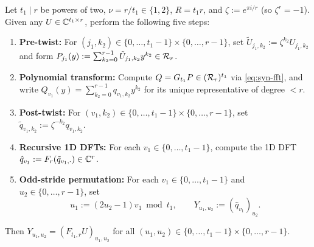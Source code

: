 \begin{proposition}\label{thm:twisted}
Let $t_1 \mid r$ be powers of two, $\nu = r / t_1 \in \{1, 2\}$, $R = t_1 r$, and $\zeta := e^{\pi i / r}$ (so $\zeta^r = -1$). Given any $U \in \mathbb{C}^{t_1 \times r}$, perform the following five steps:
\begin{enumerate}[label=\textbf{\arabic*.},leftmargin=*]
  \item \textbf{Pre-twist:} For $(j_1, k_2) \in \{0, \dots, t_1-1\} \times \{0, \dots, r-1\}$, set $\tilde{U}_{j_1, k_2} := \zeta^{k_2} U_{j_1, k_2}$ and form $P_{j_1}(y) := \sum_{k_2=0}^{r-1} \tilde{U}_{j_1, k_2} y^{k_2} \in \mathcal{R}_r$.
  \item \textbf{Polynomial transform:} Compute $Q = G_{t_1} P \in (\mathcal{R}_r)^{t_1}$ via \eqref{eq:syn-fft}, and write $Q_{v_1}(y) = \sum_{k_2=0}^{r-1} q_{v_1, k_2} y^{k_2}$ for its unique representative of degree $< r$.
  \item \textbf{Post-twist:} For $(v_1, k_2) \in \{0, \dots, t_1-1\} \times \{0, \dots, r-1\}$, set $\tilde{q}_{v_1, k_2} := \zeta^{-k_2} q_{v_1, k_2}$.
  \item \textbf{Recursive 1D DFTs:} For each $v_1 \in \{0, \dots, t_1-1\}$, compute the 1D DFT $\hat{q}_{v_1} := F_r(\tilde{q}_{v_1, \cdot}) \in \mathbb{C}^r$.
  \item \textbf{Odd-stride permutation:} For each $v_1 \in \{0, \dots, t_1-1\}$ and $u_2 \in \{0, \dots, r-1\}$, set
  \begin{equation}\label{eq:odd-perm}
    u_1 := (2u_2 - 1) v_1 \bmod t_1, \qquad Y_{u_1, u_2} := (\hat{q}_{v_1})_{u_2}.
  \end{equation}
\end{enumerate}
Then $Y_{u_1, u_2} = (F_{t_1, r} U)_{u_1, u_2}$ for all $(u_1, u_2) \in \{0, \dots, t_1-1\} \times \{0, \dots, r-1\}$.
\end{proposition}

